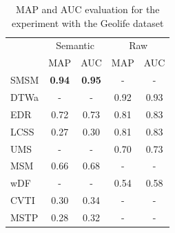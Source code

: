 \documentclass[12pt]{article}
\begin{document}
\begin{table}[ht!]
  \scriptsize
  \centering
  \begin{tabular}{|l|c|c|c|c|}
  	\hline
 & \multicolumn{2}{c}{Semantic}& \multicolumn{2}{|c|}{Raw}\\
 	\cline{2-5}
 & MAP & AUC & MAP & AUC\\
  	\hline
SMSM & \textbf{0.94} & \textbf{0.95} & - & -\\
DTWa & - & - & 0.92 & 0.93\\
 EDR & 0.72 & 0.73 & 0.81 & 0.83\\
LCSS & 0.27 & 0.30 & 0.81 & 0.83\\
 UMS & - & - & 0.70 & 0.73\\
 MSM & 0.66 & 0.68 & - & -\\
 wDF & - & - & 0.54 & 0.58\\
CVTI & 0.30 & 0.34 & - & -\\
MSTP & 0.28 & 0.32 & - & -\\
    \hline
  \end{tabular}
  \caption{MAP and AUC evaluation for the experiment with the Geolife dataset}
  \label{tab:geolife_measures_map_auc}
\end{table}

\end{document}
